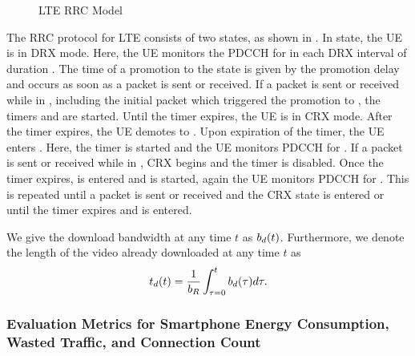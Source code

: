 \begin{figure}
\begin{center}
  
  \caption{LTE RRC Model}
  \label{fig:application:lte_video:system_model:lte_network_model:model_lte}
\end{center}
\end{figure}

The \gls{RRC} protocol for \gls{LTE} consists of two states, as shown in .
In \rrcidle state, the \gls{UE} is in \gls{DRX} mode.
Here, the \gls{UE} monitors the \gls{PDCCH} for \tonidle in each \gls{DRX} interval of duration \tdrxidle.
The time of a promotion to the \rrcconnected state is given by the promotion delay \promotiondelay and occurs as soon as a packet is sent or received.
If a packet is sent or received while in \rrcconnected, including the initial packet which triggered the promotion to \rrcconnected, the timers \tdrxinactivity and \tidle are started.
Until the \tdrxinactivity timer expires, the \gls{UE} is in \gls{CRX} mode.
After the \tidle timer expires, the \gls{UE} demotes to \rrcidle.
Upon expiration of the \tdrxinactivity timer, the \gls{UE} enters \shortdrx.
Here, the \tshortdrx timer is started and the \gls{UE} monitors \gls{PDCCH} for \ton.
If a packet is sent or received while in \shortdrx, \gls{CRX} begins and the \tshortdrx timer is disabled.
Once the \tshortdrx timer expires, \longdrx is entered and \tlongdrx is started, again the \gls{UE} monitors \gls{PDCCH} for \ton.
This is repeated until a packet is sent or received and the \gls{CRX} state is entered or until the \tidle timer expires and \rrcidle is entered.

We give the download bandwidth at any time \(t\) as \(b_d(t)\).
Furthermore, we denote the length of the video already downloaded at any time \(t\) as 
\begin{equation}
t_d(t) = \frac{1}{b_R} \int_{\tau=0}^t b_d(\tau) d\mathrm{\tau}.
\end{equation}

\subsubsection*{Evaluation Metrics for Smartphone Energy Consumption, Wasted Traffic, and Connection Count}\label{sec:application:lte_video:system_model:model_assumptions:metrics}

